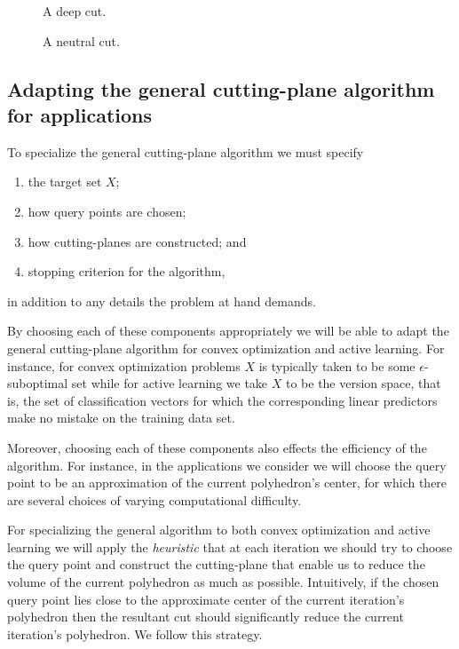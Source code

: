\documentclass[11pt]{amsart}
\theoremstyle{definition}
\theoremstyle{remark}
\begin{document}
        \begin{figure}
            \caption{A deep cut.}
        \end{figure}

        \begin{figure}
            \caption{A neutral cut.}
        \end{figure}

    \subsection{Adapting the general cutting-plane algorithm for applications}\label{ss:adapt}
        To specialize the general cutting-plane algorithm we must specify
        \begin{enumerate}
            \item the target set $X$;
            \item how query points are chosen; 
            \item how cutting-planes are constructed; and
            \item stopping criterion for the algorithm, 
        \end{enumerate}
        in addition to any details the problem at hand demands.

        By choosing each of these components appropriately we will be able to adapt the general cutting-plane algorithm for convex optimization and active learning. For instance, for convex optimization problems $X$ is typically taken to be some $\epsilon$-suboptimal set while for active learning we take $X$ to be the version space, that is, the set of classification vectors for which the corresponding linear predictors make no mistake on the training data set. 

        Moreover, choosing each of these components also effects the efficiency of the algorithm. For instance, in the applications we  consider we will choose the query point to be an approximation of the current polyhedron's center, for which there are several choices of varying computational difficulty. 

        For specializing the general algorithm to both convex optimization and active learning we will apply the \emph{heuristic} that at each iteration we should try to choose the query point and construct the cutting-plane that enable us to reduce the volume of the current polyhedron as much as possible. Intuitively, if the chosen query point lies close to the approximate center of the current iteration's polyhedron then the resultant cut should significantly reduce the current iteration's polyhedron. We follow this strategy. 
\end{document}
